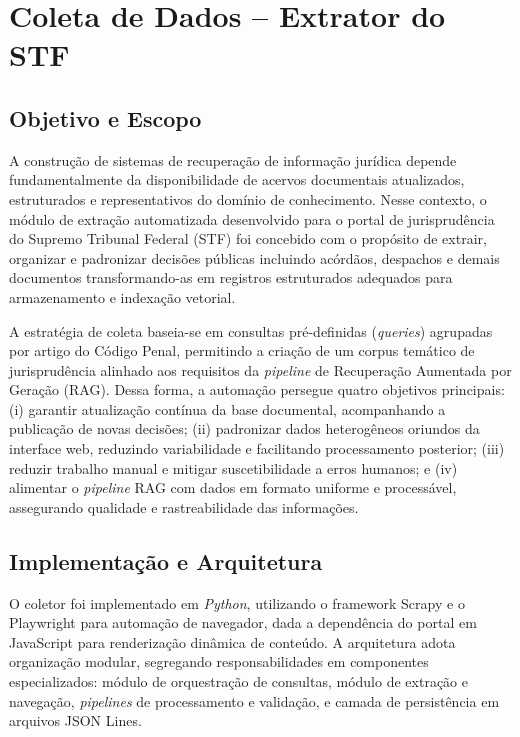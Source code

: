 \section{Coleta de Dados -- Extrator do STF}
\label{sec:stf_scraper}

\subsection{Objetivo e Escopo}
A construção de sistemas de recuperação de informação jurídica depende fundamentalmente da disponibilidade de acervos documentais atualizados, estruturados e representativos do domínio de conhecimento. Nesse contexto, o módulo de extração automatizada desenvolvido para o portal de jurisprudência do Supremo Tribunal Federal (STF) foi concebido com o propósito de extrair, organizar e padronizar decisões públicas incluindo acórdãos, despachos e demais documentos transformando-as em registros estruturados adequados para armazenamento e indexação vetorial.

A estratégia de coleta baseia-se em consultas pré-definidas (\textit{queries}) agrupadas por artigo do Código Penal, permitindo a criação de um corpus temático de jurisprudência alinhado aos requisitos da \textit{pipeline} de Recuperação Aumentada por Geração (RAG). Dessa forma, a automação persegue quatro objetivos principais: (i) garantir atualização contínua da base documental, acompanhando a publicação de novas decisões; (ii) padronizar dados heterogêneos oriundos da interface web, reduzindo variabilidade e facilitando processamento posterior; (iii) reduzir trabalho manual e mitigar suscetibilidade a erros humanos; e (iv) alimentar o \textit{pipeline} RAG com dados em formato uniforme e processável, assegurando qualidade e rastreabilidade das informações.

\subsection{Implementação e Arquitetura}
O coletor foi implementado em \textit{Python}, utilizando o framework Scrapy e o Playwright para automação de navegador, dada a dependência do portal em JavaScript para renderização dinâmica de conteúdo. A arquitetura adota organização modular, segregando responsabilidades em componentes especializados: módulo de orquestração de consultas, módulo de extração e navegação, \textit{pipelines} de processamento e validação, e camada de persistência em arquivos JSON Lines.

